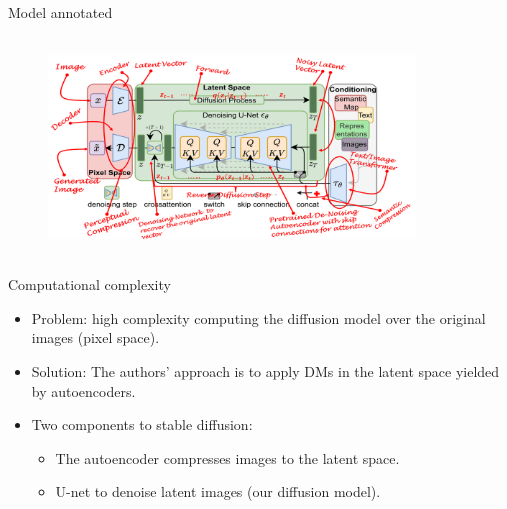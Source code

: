 \documentclass[8pt]{beamer}
\begin{document}
\begin{frame}{Model annotated}
   \begin{figure}
       \centering
       \includegraphics[width=276pt, height=165pt]{images/model_diagram_annotated.png}
       \label{fig:NN_training}
   \end{figure} 
   \cite{steins}
\end{frame}



\begin{frame}{Computational complexity}
    \begin{itemize}
        \item Problem: high complexity computing the diffusion model over the original images (pixel space).
        \item Solution: The authors' approach is to apply DMs in the latent space yielded by autoencoders.
        \item Two components to stable diffusion:
        \begin{itemize}
            \item The autoencoder compresses images to the latent space.
            \item U-net to denoise latent images (our diffusion model).
        \end{itemize}
    \end{itemize}
\end{frame}
\end{document}
